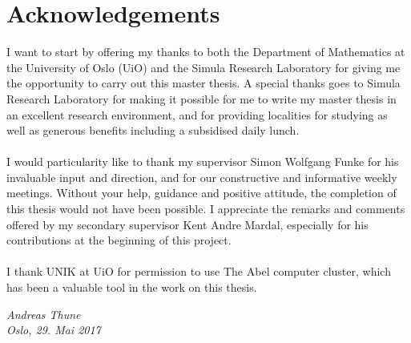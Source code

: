 \chapter*{Acknowledgements}
I want to start by offering my thanks to both the Department of Mathematics at the University of Oslo (UiO) and the Simula Research Laboratory for giving me the opportunity to carry out this master thesis. A special thanks goes to Simula Research Laboratory for making it possible for me to write my master thesis in an excellent research environment, and for providing localities for studying as well as generous benefits including a subsidised daily lunch.
\\
\\
I would particularity like to thank my supervisor Simon Wolfgang Funke for his invaluable input and direction, and for our constructive and informative weekly meetings. Without your help, guidance and positive attitude, the completion of this thesis would not have been possible. I appreciate the remarks and comments offered by my secondary supervisor Kent Andre Mardal, especially for his contributions at the beginning of this project.
\\
\\
I thank UNIK at UiO for permission to use The Abel computer cluster, which has been a valuable tool in the work on this thesis.
\begin{flushright}
\textit{
Andreas Thune
\\
Oslo, 29. Mai 2017}
\end{flushright}